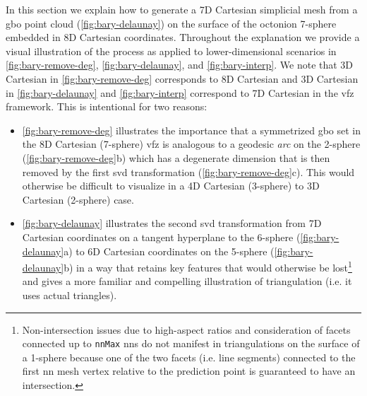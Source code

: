 \documentclass[final,twocolumn,12pt]{elsarticle}
\newcommand{\outpt}{prediction}
\begin{document}
\begin{appendices}
In this section we explain how to generate a 7D Cartesian simplicial mesh from a \gls{gbo} point cloud (\cref{fig:bary-delaunay}) on the surface of the octonion 7-sphere embedded in 8D Cartesian coordinates. Throughout the explanation we provide a visual illustration of the process as applied to lower-dimensional scenarios in \cref{fig:bary-remove-deg}, \cref{fig:bary-delaunay}, and \cref{fig:bary-interp}. We note that 3D Cartesian in \cref{fig:bary-remove-deg} corresponds to 8D Cartesian and 3D Cartesian in \cref{fig:bary-delaunay} and \cref{fig:bary-interp} correspond to 7D Cartesian in the \gls{vfz} framework. This is intentional for two reasons:
\begin{itemize}
    \item \cref{fig:bary-remove-deg} illustrates the importance that a symmetrized \gls{gbo} set in the 8D Cartesian (7-sphere) \gls{vfz} is analogous to a geodesic \textit{arc} on the 2-sphere (\cref{fig:bary-remove-deg}b) which has a degenerate dimension that is then removed by the first \gls{svd} transformation (\cref{fig:bary-remove-deg}c). This would otherwise be difficult to visualize in a 4D Cartesian (3-sphere) to 3D Cartesian (2-sphere) case.
    \item \cref{fig:bary-delaunay} illustrates the second \gls{svd} transformation from 7D Cartesian coordinates on a tangent hyperplane to the 6-sphere (\cref{fig:bary-delaunay}a) to 6D Cartesian coordinates on the 5-sphere (\cref{fig:bary-delaunay}b) in a way that retains key features that would otherwise be lost\footnote{Non-intersection issues due to high-aspect ratios and consideration of facets connected up to \texttt{nnMax} \glspl{nn} do not manifest in triangulations on the surface of a 1-sphere because one of the two facets (i.e. line segments) connected to the first \gls{nn} mesh vertex relative to the \outpt{} point is guaranteed to have an intersection.} and gives a more familiar and compelling illustration of triangulation (i.e. it uses actual triangles).
\end{itemize}


\end{appendices}
\end{document}
